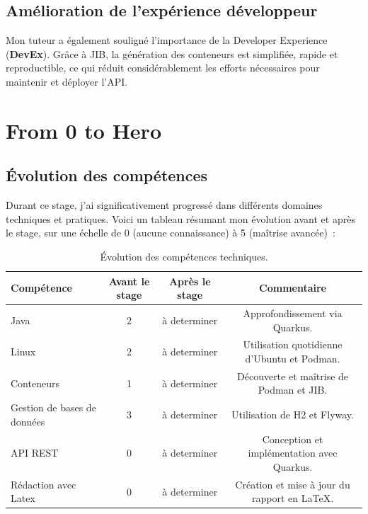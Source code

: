 \documentclass{article}
\begin{document}
	\subsection{Amélioration de l'expérience développeur}
	
	Mon tuteur a également souligné l'importance de la Developer Experience (\textbf{DevEx}). Grâce à JIB, la génération des conteneurs est simplifiée, rapide et reproductible, ce qui réduit considérablement les efforts nécessaires pour maintenir et déployer l'API.
	
	\newpage
	\section{From 0 to Hero}
	
	\subsection{Évolution des compétences}
	
	Durant ce stage, j'ai significativement progressé dans différents domaines techniques et pratiques. Voici un tableau résumant mon évolution avant et après le stage, sur une échelle de 0 (aucune connaissance) à 5 (maîtrise avancée) :
	
	\begin{table}[h!]
		\centering
		\begin{tabular}{|l|c|c|c|}
			\hline
			\textbf{Compétence}         & \textbf{Avant le stage} & \textbf{Après le stage} & \textbf{Commentaire} \\ \hline
			Java                        & 2                       & à determiner            & Approfondissement via Quarkus. \\ \hline
			Linux                       & 2                       & à determiner            & Utilisation quotidienne d'Ubuntu et Podman. \\ \hline
			Conteneurs                  & 1                       & à determiner            & Découverte et maîtrise de Podman et JIB. \\ \hline
			Gestion de bases de données & 3                       & à determiner            & Utilisation de H2 et Flyway. \\ \hline
			API REST                    & 0                       & à determiner            & Conception et implémentation avec Quarkus. \\ \hline
			Rédaction avec Latex    & 0 & à determiner& Création et mise à jour du rapport en \LaTeX. \\ \hline
		\end{tabular}
		\caption{Évolution des compétences techniques.}
		\label{tab:competences}
	\end{table}
	
\end{document}
